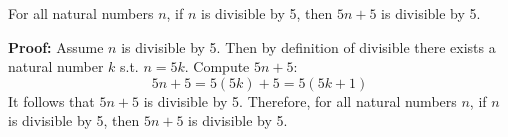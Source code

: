 \documentclass[12pt,addpoints]{exam}
\begin{document}
\begin{questions}
\question For all natural numbers $n$, if $n$ is divisible by 5,
then $5n+5$ is divisible by 5.
    \begin{solution} \textbf{Proof:} Assume $n$ is divisible by 5.
    Then by definition of divisible there exists a natural number
    $k$ s.t. $n=5k$. Compute $5n+5$:
    \[ 5n + 5 = 5(5k) + 5 = 5(5k + 1) \]
    It follows that $5n+5$ is divisible by 5. Therefore, for all
    natural numbers $n$, if $n$ is divisible by 5, then $5n+5$ is
    divisible by 5.
    \end{solution}



\end{questions}
\end{document}
